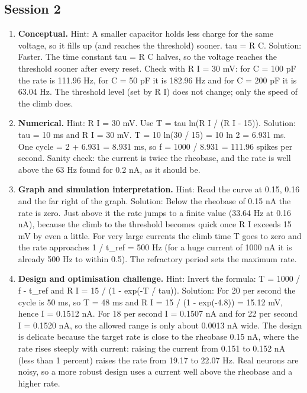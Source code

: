 \documentclass[11pt,a4paper]{article}
\begin{document}
\subsection*{Session 2}
\begin{enumerate}[nosep]
\item \textbf{Conceptual.} Hint: A smaller capacitor holds less charge for the same voltage, so it fills up (and reaches the threshold) sooner. tau = R C. Solution: Faster. The time constant tau = R C halves, so the voltage reaches the threshold sooner after every reset. Check with R I = 30 mV: for C = 100 pF the rate is 111.96 Hz, for C = 50 pF it is 182.96 Hz and for C = 200 pF it is 63.04 Hz. The threshold level (set by R I) does not change; only the speed of the climb does.
\item \textbf{Numerical.} Hint: R I = 30 mV. Use T = tau ln(R I / (R I - 15)). Solution: tau = 10 ms and R I = 30 mV. T = 10 ln(30 / 15) = 10 ln 2 = 6.931 ms. One cycle = 2 + 6.931 = 8.931 ms, so f = 1000 / 8.931 = 111.96 spikes per second. Sanity check: the current is twice the rheobase, and the rate is well above the 63 Hz found for 0.2 nA, as it should be.
\item \textbf{Graph and simulation interpretation.} Hint: Read the curve at 0.15, 0.16 and the far right of the graph. Solution: Below the rheobase of 0.15 nA the rate is zero. Just above it the rate jumps to a finite value (33.64 Hz at 0.16 nA), because the climb to the threshold becomes quick once R I exceeds 15 mV by even a little. For very large currents the climb time T goes to zero and the rate approaches 1 / t\_ref = 500 Hz (for a huge current of 1000 nA it is already 500 Hz to within 0.5). The refractory period sets the maximum rate.
\item \textbf{Design and optimisation challenge.} Hint: Invert the formula: T = 1000 / f - t\_ref and R I = 15 / (1 - exp(-T / tau)). Solution: For 20 per second the cycle is 50 ms, so T = 48 ms and R I = 15 / (1 - exp(-4.8)) = 15.12 mV, hence I = 0.1512 nA. For 18 per second I = 0.1507 nA and for 22 per second I = 0.1520 nA, so the allowed range is only about 0.0013 nA wide. The design is delicate because the target rate is close to the rheobase 0.15 nA, where the rate rises steeply with current: raising the current from 0.151 to 0.152 nA (less than 1 percent) raises the rate from 19.17 to 22.07 Hz. Real neurons are noisy, so a more robust design uses a current well above the rheobase and a higher rate.
\end{enumerate}
\end{document}

